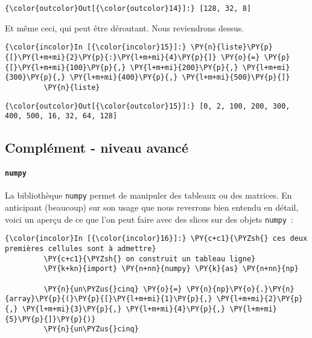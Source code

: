 \begin{Verbatim}[commandchars=\\\{\}]
{\color{outcolor}Out[{\color{outcolor}14}]:} [128, 32, 8]
\end{Verbatim}
            
    Et même ceci, qui peut être déroutant. Nous reviendrons dessus.

    \begin{Verbatim}[commandchars=\\\{\}]
{\color{incolor}In [{\color{incolor}15}]:} \PY{n}{liste}\PY{p}{[}\PY{l+m+mi}{2}\PY{p}{:}\PY{l+m+mi}{4}\PY{p}{]} \PY{o}{=} \PY{p}{[}\PY{l+m+mi}{100}\PY{p}{,} \PY{l+m+mi}{200}\PY{p}{,} \PY{l+m+mi}{300}\PY{p}{,} \PY{l+m+mi}{400}\PY{p}{,} \PY{l+m+mi}{500}\PY{p}{]}
         \PY{n}{liste}
\end{Verbatim}


\begin{Verbatim}[commandchars=\\\{\}]
{\color{outcolor}Out[{\color{outcolor}15}]:} [0, 2, 100, 200, 300, 400, 500, 16, 32, 64, 128]
\end{Verbatim}
            
    \hypertarget{compluxe9ment---niveau-avancuxe9}{%
\subsection{Complément - niveau
avancé}\label{compluxe9ment---niveau-avancuxe9}}

    \hypertarget{numpy}{%
\paragraph{\texorpdfstring{\texttt{numpy}}{numpy}}\label{numpy}}

    La bibliothèque \texttt{numpy} permet de manipuler des tableaux ou des
matrices. En anticipant (beaucoup) sur son usage que nous reverrons bien
entendu en détail, voici un aperçu de ce que l'on peut faire avec des
slices sur des objets \texttt{numpy}~:

    \begin{Verbatim}[commandchars=\\\{\}]
{\color{incolor}In [{\color{incolor}16}]:} \PY{c+c1}{\PYZsh{} ces deux premières cellules sont à admettre}
         \PY{c+c1}{\PYZsh{} on construit un tableau ligne}
         \PY{k+kn}{import} \PY{n+nn}{numpy} \PY{k}{as} \PY{n+nn}{np}
         
         \PY{n}{un\PYZus{}cinq} \PY{o}{=} \PY{n}{np}\PY{o}{.}\PY{n}{array}\PY{p}{(}\PY{p}{[}\PY{l+m+mi}{1}\PY{p}{,} \PY{l+m+mi}{2}\PY{p}{,} \PY{l+m+mi}{3}\PY{p}{,} \PY{l+m+mi}{4}\PY{p}{,} \PY{l+m+mi}{5}\PY{p}{]}\PY{p}{)}
         \PY{n}{un\PYZus{}cinq}
\end{Verbatim}


